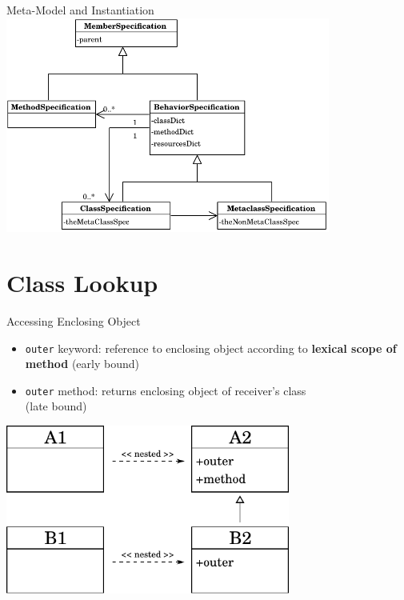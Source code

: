 \documentclass[xcolor=dvipsname, handout]{beamer} %
\begin{document}
\begin{frame}{Meta-Model and Instantiation}
  \centering
  \includegraphics[width=0.8\textwidth]{metamodel.pdf}
\end{frame}

\section{Class Lookup}
\begin{frame}{Accessing Enclosing Object}
  \begin{itemize}
    \item \texttt{outer} keyword: reference to enclosing object according to \textbf{lexical scope of method} (early bound)
    \item \texttt{outer} method: returns enclosing object of receiver's class \\ (late bound)
  \end{itemize}

  \begin{table}
    \centering
    \includegraphics[width=0.7\textwidth]{outer_binding.pdf}
    \end{table}
\end{frame}
\end{document}
